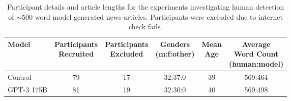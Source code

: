 \begin{table}
    \begin{center}
        \begin{tabular}{l c c c c c}
        \toprule
        Model & \shortstack{Participants\\Recruited}  & \shortstack{Participants\\Excluded} & \shortstack{Genders\\(m:f:other)} & \shortstack{Mean\\Age} & \shortstack{Average\\Word Count\\(human:model)} \\ 
        \midrule
        Control  & 79 & 17 & 32:37:0 & 39 & 569:464 \\ 
        GPT-3 175B & 81 & 19  & 32:30:0 &  40 & 569:498 \\ 
        \bottomrule
        \end{tabular}
    \end{center}
    \caption{Participant details and  article lengths for the experiments investigating  human detection of $\sim500$ word model generated news articles. Participants were excluded due to internet check fails.}
    \label{table:study_long}
\end{table}